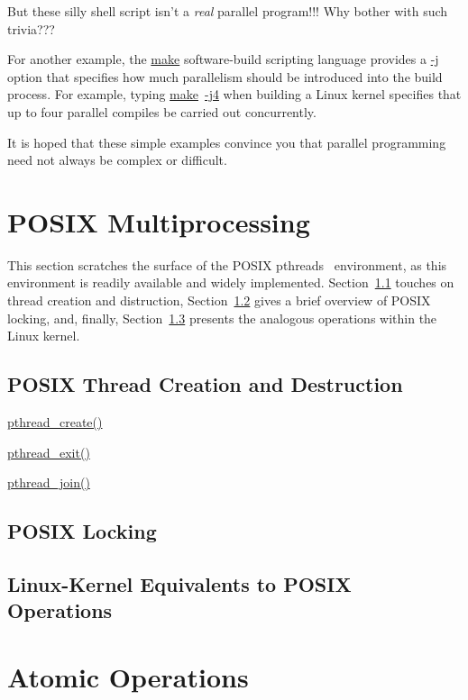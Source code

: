 \QuickQuiz{}
	But these silly shell script isn't a \emph{real} parallel
	program!!!
	Why bother with such trivia???
 \QuickQuizEnd

For another example, the \url{make} software-build scripting language 
provides a \url{-j} option that specifies how much parallelism should be
introduced into the build process.
For example, typing \url{make}~\url{-j4} when building a Linux kernel
specifies that up to four parallel compiles be carried out concurrently.

It is hoped that these simple examples convince you that parallel
programming need not always be complex or difficult.

\section{POSIX Multiprocessing}
\label{sec:toolsoftrade:POSIX Multiprocessing}

This section scratches the surface of the
POSIX pthreads~\cite{OpenGroup1997pthreads}
environment, as this environment is readily available and widely
implemented.
Section~\ref{sec:toolsoftrade:POSIX Thread Creation and Destruction}
touches on thread creation and distruction,
Section~\ref{sec:toolsoftrade:POSIX Locking} gives a brief overview
of POSIX locking, and, finally,
Section~\ref{sec:toolsoftrade:Linux-Kernel Equivalents to POSIX Operations}
presents the analogous operations within the Linux kernel.

\subsection{POSIX Thread Creation and Destruction}
\label{sec:toolsoftrade:POSIX Thread Creation and Destruction}

\url{pthread_create()}

\url{pthread_exit()}

\url{pthread_join()}

\subsection{POSIX Locking}
\label{sec:toolsoftrade:POSIX Locking}

\subsection{Linux-Kernel Equivalents to POSIX Operations}
\label{sec:toolsoftrade:Linux-Kernel Equivalents to POSIX Operations}

\section{Atomic Operations}
\label{sec:toolsoftrade:Atomic Operations}
